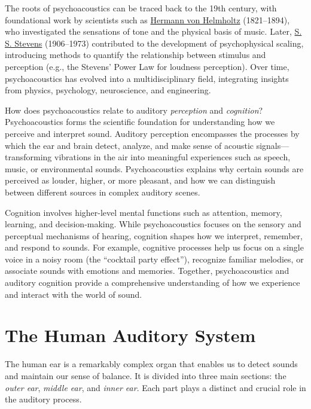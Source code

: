 \documentclass{article}
\begin{document}
The roots of psychoacoustics can be traced back to the 19th century, with foundational work by scientists such as \href{https://en.wikipedia.org/wiki/Hermann\_von\_Helmholtz}{Hermann von Helmholtz} (1821--1894), who investigated the sensations of tone and the physical basis of music. Later, \href{https://en.wikipedia.org/wiki/Stanley\_Smith\_Stevens}{S. S. Stevens}  (1906--1973) contributed to the development of psychophysical scaling, introducing methods to quantify the relationship between stimulus and perception (e.g., the Stevens' Power Law for loudness perception). Over time, psychoacoustics has evolved into a multidisciplinary field, integrating insights from physics, psychology, neuroscience, and engineering.

How does psychoacoustics relate to auditory \textit{perception} and \textit{cognition}? Psychoacoustics forms the scientific foundation for understanding how we perceive and interpret sound. Auditory perception encompasses the processes by which the ear and brain detect, analyze, and make sense of acoustic signals---transforming vibrations in the air into meaningful experiences such as speech, music, or environmental sounds. Psychoacoustics explains why certain sounds are perceived as louder, higher, or more pleasant, and how we can distinguish between different sources in complex auditory scenes.

Cognition involves higher-level mental functions such as attention, memory, learning, and decision-making. While psychoacoustics focuses on the sensory and perceptual mechanisms of hearing, cognition shapes how we interpret, remember, and respond to sounds. For example, cognitive processes help us focus on a single voice in a noisy room (the ``cocktail party effect''), recognize familiar melodies, or associate sounds with emotions and memories. Together, psychoacoustics and auditory cognition provide a comprehensive understanding of how we experience and interact with the world of sound.

\section{The Human Auditory System}

The human ear is a remarkably complex organ that enables us to detect sounds and maintain our sense of balance. It is divided into three main sections: the \textit{outer ear}, \textit{middle ear}, and \textit{inner ear}. Each part plays a distinct and crucial role in the auditory process.
\end{document}
